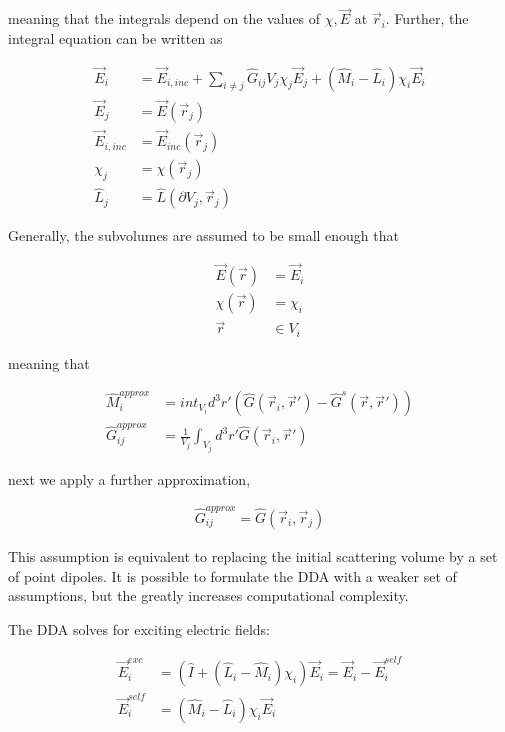     meaning that the integrals depend on the values of $\chi, \vec{E}$ at $\vec{r}_i$. Further, the integral equation can be written as

    \begin{align}
        \vec{E}_i &= \vec{E}_{i, inc} + \sum_{i\neq j}\hat{G}_{ij}V_j\chi_j\vec{E}_j + \left(\hat{M}_i -\hat{L}_i\right)\chi_i\vec{E}_i \\
        \vec{E}_j &= \vec{E}(\vec{r}_j) \\
        \vec{E}_{i, inc} &= \vec{E}_{inc}(\vec{r}_j) \\
        \chi_j &= \chi(\vec{r}_j) \\
        \hat{L}_j &= \hat{L}(\partial V_j, \vec{r}_j)
    \end{align}

    Generally, the subvolumes are assumed to be small enough that

    \begin{align}
        \vec{E}(\vec{r}) &= \vec{E}_i \\
        \chi(\vec{r}) &= \chi_i \\
        \vec{r} &\in V_i
    \end{align}

    meaning that

    \begin{align}
        \hat{M}_{i}^{approx} &= int_{V_i}d^3r'\left(\hat{G}(\vec{r}_i, \vec{r}') - \hat{G}^s(\vec{r}, \vec{r}')\right) \\
        \hat{G}_{ij}^{approx} &= \frac{1}{V_j}\int_{V_j}d^3r'\hat{G}(\vec{r}_i, \vec{r}')
    \end{align}

    next we apply a further approximation,

    \begin{align}
        \hat{G}_{ij}^{approx} = \hat{G}(\vec{r}_i, \vec{r}_j)
    \end{align}

    This assumption is equivalent to replacing the initial scattering volume by a set of point dipoles. It is possible
    to formulate the DDA with a weaker set of assumptions, but the greatly increases computational complexity.

    The DDA solves for exciting electric fields:

    \begin{align}
        \vec{E}_i^{exc} &= \left(\hat{I} + \left(\hat{L}_i - \hat{M}_i \right)\chi_i\right)\vec{E}_i = \vec{E}_i - \vec{E}_i^{self} \\
        \vec{E}_i^{self}&= \left(\hat{M}_i - \hat{L}_i \right)\chi_i\vec{E}_i
    \end{align}

